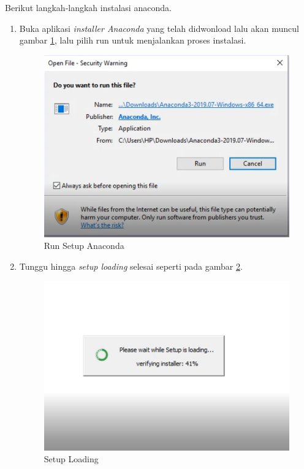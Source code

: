 Berikut langkah-langkah instalasi anaconda.
\begin{enumerate}
\item Buka aplikasi \textit{installer Anaconda} yang telah didwonload lalu akan muncul  gambar \ref{langkah1}, lalu pilih run untuk menjalankan proses instalasi. 
\begin{figure}[H]
        \centerline{\includegraphics[scale=0.75]{figures/1}}
        \caption{Run Setup Anaconda}
		\label{langkah1}
\end{figure}

\item Tunggu hingga \textit{setup loading} selesai seperti pada gambar \ref{langkah2}.
\begin{figure}[H]
        \centerline{\includegraphics[scale=0.75]{figures/2}}
        \caption{Setup Loading}
		\label{langkah2}
\end{figure}


\end{enumerate}
